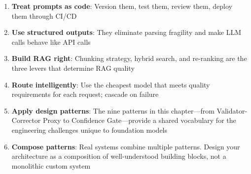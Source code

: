 \begin{enumerate}[leftmargin=*]
    \item \textbf{Treat prompts as code}: Version them, test them, review them, deploy them through CI/CD
    \item \textbf{Use structured outputs}: They eliminate parsing fragility and make LLM calls behave like API calls
    \item \textbf{Build RAG right}: Chunking strategy, hybrid search, and re-ranking are the three levers that determine RAG quality
    \item \textbf{Route intelligently}: Use the cheapest model that meets quality requirements for each request; cascade on failure
    \item \textbf{Apply design patterns}: The nine patterns in this chapter---from Validator-Corrector Proxy to Confidence Gate---provide a shared vocabulary for the engineering challenges unique to foundation models
    \item \textbf{Compose patterns}: Real systems combine multiple patterns. Design your architecture as a composition of well-understood building blocks, not a monolithic custom system
\end{enumerate}
